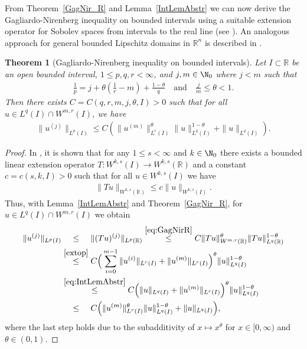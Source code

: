 \documentclass{article}
\numberwithin{figure}{section}
\newcommand{\R}{\mathbb{R}}
\newtheorem{theorem}{Theorem}[section]
\numberwithin{equation}{section}
\begin{document}
From Theorem~\ref{GagNir_R} and Lemma~\ref{IntLemAbstr} we can now derive the Gagliardo-Nirenberg inequality on bounded intervals using a suitable extension operator for Sobolev spaces from intervals to the real line (see \cite{Rog}). An analogous approach for general bounded Lipschitz domains in $\R^n$ is described in \cite[Theorem~1.3]{LiZha}.

\begin{theorem}[Gagliardo-Nirenberg inequality on bounded intervals] \label{GagNir}
Let $I \subset \R$ be an open bounded interval, $1 \leq p,q,r < \infty$,
and $j,m \in \N_0$ where $j<m$ such that
\begin{align} \label{bedGN}
    \frac 1p = j + \theta \left( \frac1r - m \right) + \frac{1-\theta}{q} \quad \text{and} \quad \frac jm \leq \theta < 1.
\end{align}
Then there exists $C=C(q,r,m,j,\theta,I)>0$ such that for all $u \in L^q(I) \cap W^{m,r}(I)$, we have
\begin{align} \label{eq:GagNir}
    \|u^{(j)}\|_{L^p(I)} \leq C\left( \|u^{(m)}\|^{\theta}_{L^r(I)} \|u\|^{1-\theta}_{L^q(I)} + \|u\|_{L^q(I)}\right).
\end{align}
\end{theorem}

\begin{proof}
    In \cite[Theorem~8]{Rog}, it is shown that for any $1 \leq s < \infty$ and $k \in \N_0$ there exists a bounded linear extension operator $T \colon W^{k,s}(I) \to W^{k,s}(\R)$ and a constant $c=c(s,k,I)>0$ such that for all $u \in W^{k,s}(I)$ we have
    \begin{align} \label{extop}
        \|Tu\|_{W^{k,s}(\R)} \leq c \|u\|_{W^{k,s}(I)}.
    \end{align}
    Thus, with Lemma~\ref{IntLemAbstr} and Theorem~\ref{GagNir_R}, for $u \in L^q(I) \cap W^{m,r}(I)$ we obtain
    \setlength\jot{0.6cm}
    \begin{align}
        \|u^{(j)}\|_{L^p(I)} & \overset{\hphantom{\eqref{extop}}}{\leq} \|(T u)^{(j)}\|_{L^p(\R)}
        \overset{\eqref{eq:GagNirR}}{\leq} C \|Tu\|^{\theta}_{W^{m,r}(\R)} \|Tu\|^{1-\theta}_{L^q(\R)}\\
        &\overset{\eqref{extop}}{\leq} C \Big(\sum_{i=0}^{m-1} \|u^{(i)}\|_{L^{r}(I)} + \|u^{(m)}\|_{L^{r}(I)}\Big)^{\theta} \|u\|^{1-\theta}_{L^q(I)}\\
        & \overset{\eqref{eq:IntLemAbstr}}{\leq} C \Big(\|u\|_{L^q(I)}+ \|u^{(m)}\|_{L^{r}(I)}\Big)^{\theta} \|u\|^{1-\theta}_{L^q(I)}\\
        & \overset{\hphantom{\eqref{extop}}}{\leq} C \Big(\|u^{(m)}\|^\theta_{L^{r}(I)} \|u\|^{1-\theta}_{L^q(I)} + \|u\|_{L^q(I)}\Big),
    \end{align}
    where the last step holds due to the subadditivity of $x \mapsto x^\theta$ for $x \in [0, \infty)$ and $\theta \in (0,1)$.
\end{proof}
\end{document}
